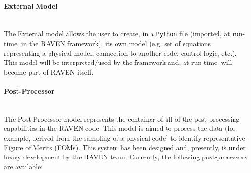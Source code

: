 \paragraph{External Model} ~\\
The External model allows the user to create, in a \texttt{Python} file (imported, at run-time, in the RAVEN framework), its own model (e.g. set of equations representing a physical model, connection to another code, control logic, etc.). This model will be interpreted/used by the framework and, at run-time, will become part of RAVEN itself.
\paragraph{Post-Processor} ~\\
The Post-Processor model represents the container of all of the post-processing capabilities in the RAVEN code. This model is aimed to process the data (for example, derived from the sampling of a physical code)  to identify representative Figure of Merits (FOMs). This system has  been designed and, presently, is under heavy development by the RAVEN team.  Currently, the following post-processors are available:
